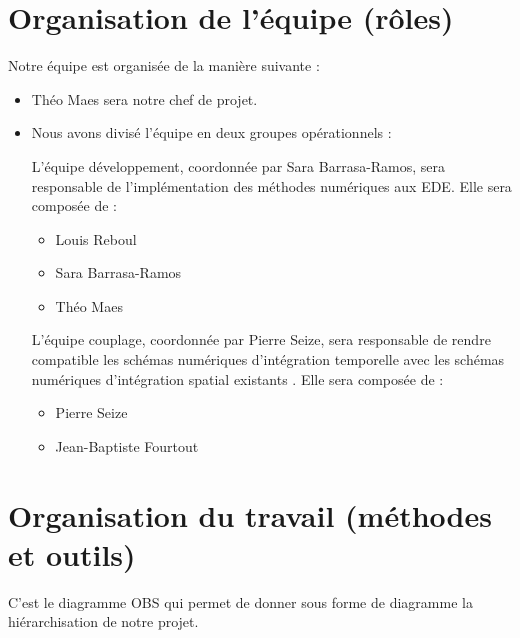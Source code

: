 \documentclass[a4paper,12pt]{report}
\theoremstyle{break}
\begin{document}
\section{Organisation de l’équipe (rôles)}
    Notre équipe est organisée de la manière suivante :
   \begin{itemize}[label=\textbullet]
   	\item Théo Maes sera notre chef de projet. 
   	\item {Nous avons divisé l’équipe en deux groupes opérationnels :
   	
   	    L’équipe développement, coordonnée par Sara Barrasa-Ramos, sera responsable de l'implémentation des méthodes numériques aux EDE. Elle sera composée de :
   	    \begin{itemize}[label=\textbullet]
   	    \item Louis Reboul
   	    \item Sara Barrasa-Ramos
   	    \item Théo Maes
        \end{itemize}
        
        L’équipe couplage, coordonnée par Pierre Seize, sera responsable de rendre compatible les schémas numériques d'intégration temporelle avec les schémas numériques d'intégration spatial existants . Elle sera composée de :
   	    \begin{itemize}[label=\textbullet]
   	    \item Pierre Seize
   	    \item Jean-Baptiste Fourtout
        \end{itemize}
        }
    \end{itemize}
\section{Organisation du travail (méthodes et outils)}
    C’est le diagramme OBS qui permet de donner sous forme de diagramme la hiérarchisation de notre projet.
    
\end{document}
